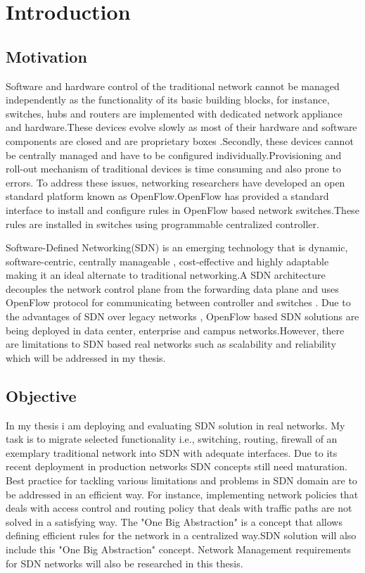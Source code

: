 \chapter{Introduction}
\label{ch:Introduction}
\section{Motivation}
Software and hardware control of the traditional network cannot be managed independently as the functionality of its basic building blocks, for instance, switches, hubs and routers are implemented with dedicated network appliance and hardware.These devices evolve slowly as most of their hardware and software components are closed and are proprietary boxes .Secondly, these devices cannot be centrally managed and have to be configured individually.Provisioning and roll-out mechanism of traditional devices is time consuming and also prone to errors\cite{OpenFlow}.
To address these issues, networking researchers have developed an open standard platform known as OpenFlow\cite{OpenFlow}.OpenFlow has provided a standard interface to install and configure rules in OpenFlow based network switches.These rules are installed in switches using programmable centralized controller. 

Software-Defined Networking(SDN) is an emerging technology that is dynamic, software-centric, centrally manageable , cost-effective and highly adaptable making it an ideal alternate to traditional networking\cite{OpenFlow}.A SDN architecture decouples the network control plane from the forwarding data plane and uses OpenFlow protocol for communicating between controller and switches . Due to the advantages of SDN over legacy networks , OpenFlow based SDN solutions are being deployed in data center, enterprise and campus networks.However, there are  limitations to SDN based real networks such as scalability and reliability  which will be addressed in my thesis.
\section{Objective}
\label{ch:Introduction:sec:Objective}
In my thesis i am deploying and evaluating SDN solution in real networks. My task is to migrate selected functionality i.e., switching, routing, firewall of an exemplary traditional network into SDN with adequate interfaces. Due to its recent deployment in production networks SDN concepts still need maturation. Best practice for tackling various limitations and problems in SDN domain are to be addressed in an efficient way. For instance, implementing network policies  that deals with access control and routing policy that deals with traffic paths are not solved in a satisfying way.
The "One Big Abstraction" is a concept that allows defining efficient rules for the network in a centralized way\cite{TB98}.SDN solution will also include  this "One Big Abstraction" concept. Network Management requirements for SDN networks will also be researched in this thesis.
